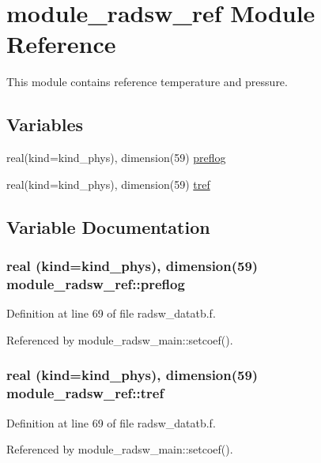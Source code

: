 \hypertarget{namespacemodule__radsw__ref}{}\section{module\+\_\+radsw\+\_\+ref Module Reference}
\label{namespacemodule__radsw__ref}


This module contains reference temperature and pressure.  


\subsection*{Variables}
\begin{DoxyCompactItemize}
\item 
real(kind=kind\+\_\+phys), dimension(59) \hyperlink{namespacemodule__radsw__ref_afb71559d084ca709bd134e6c489035e2}{preflog}
\item 
real(kind=kind\+\_\+phys), dimension(59) \hyperlink{namespacemodule__radsw__ref_a449fffa7047caa0fba6c166c26f7dbbd}{tref}
\end{DoxyCompactItemize}


\subsection{Variable Documentation}
\subsubsection[{\texorpdfstring{preflog}{preflog}}]{\setlength{\rightskip}{0pt plus 5cm}real (kind=kind\+\_\+phys), dimension(59) module\+\_\+radsw\+\_\+ref\+::preflog}\hypertarget{namespacemodule__radsw__ref_afb71559d084ca709bd134e6c489035e2}{}\label{namespacemodule__radsw__ref_afb71559d084ca709bd134e6c489035e2}


Definition at line 69 of file radsw\+\_\+datatb.\+f.



Referenced by module\+\_\+radsw\+\_\+main\+::setcoef().

\subsubsection[{\texorpdfstring{tref}{tref}}]{\setlength{\rightskip}{0pt plus 5cm}real (kind=kind\+\_\+phys), dimension(59) module\+\_\+radsw\+\_\+ref\+::tref}\hypertarget{namespacemodule__radsw__ref_a449fffa7047caa0fba6c166c26f7dbbd}{}\label{namespacemodule__radsw__ref_a449fffa7047caa0fba6c166c26f7dbbd}


Definition at line 69 of file radsw\+\_\+datatb.\+f.



Referenced by module\+\_\+radsw\+\_\+main\+::setcoef().

